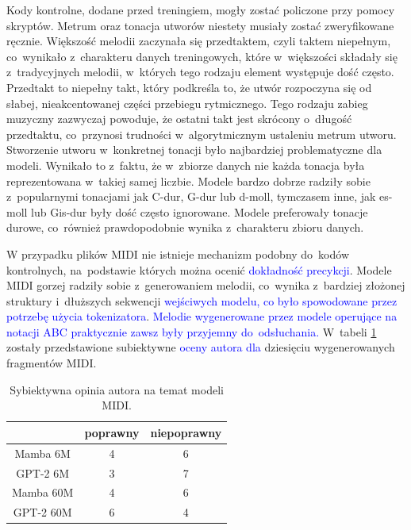 \documentclass[data-science]{agh-wi} %
\begin{document}
Kody kontrolne, dodane przed treningiem, mogły zostać policzone przy pomocy skryptów. Metrum oraz tonacja utworów niestety musiały zostać zweryfikowane ręcznie. Większość melodii zaczynała się przedtaktem, czyli taktem niepełnym, co~wynikało z~charakteru danych treningowych, które w~większości składały się z~tradycyjnych melodii, w~których tego rodzaju element występuje dość często. Przedtakt to niepełny takt, który podkreśla to, że utwór rozpoczyna się od słabej, nieakcentowanej części przebiegu rytmicznego. Tego rodzaju zabieg muzyczny zazwyczaj powoduje, że ostatni takt jest skrócony o~długość przedtaktu, co~przynosi trudności w~algorytmicznym ustaleniu metrum utworu. Stworzenie utworu w~konkretnej tonacji było najbardziej problematyczne dla modeli. Wynikało to z~faktu, że w~zbiorze danych nie każda tonacja była reprezentowana w~takiej samej liczbie. Modele bardzo dobrze radziły sobie z~popularnymi tonacjami jak C-dur, G-dur lub d-moll, tymczasem inne, jak es-moll lub Gis-dur były dość często ignorowane. Modele preferowały tonacje durowe, co~również prawdopodobnie wynika z~charakteru zbioru danych.

W przypadku plików MIDI nie istnieje mechanizm podobny do~kodów kontrolnych, na~podstawie których można ocenić \textcolor{blue}{dokładność precykcji}. Modele MIDI gorzej radziły sobie z~generowaniem melodii, co~wynika z~bardziej złożonej struktury i~dłuższych sekwencji \textcolor{blue}{wejściwych modelu, co było spowodowane przez potrzebę użycia tokenizatora}. \textcolor{blue}{Melodie wygenerowane przez modele operujące na notacji ABC praktycznie zawsz były przyjemny do~odsłuchania.} W~tabeli \ref*{tab:midi_gen} zostały przedstawione subiektywne \textcolor{blue}{oceny autora dla} dziesięciu wygenerowanych fragmentów MIDI.

\begin{table}[ht!]
    \centering
    \begin{tabular}{|c|c|c|}
        \hline
                  & poprawny & niepoprawny \\ \hline
        Mamba 6M  & 4        & 6           \\ \hline
        GPT-2 6M  & 3        & 7           \\ \hline
        Mamba 60M & 4        & 6           \\ \hline
        GPT-2 60M & 6        & 4           \\ \hline
    \end{tabular}
    \caption{Sybiektywna opinia autora na temat modeli MIDI.}\label{tab:midi_gen}
\end{table}
\end{document}
